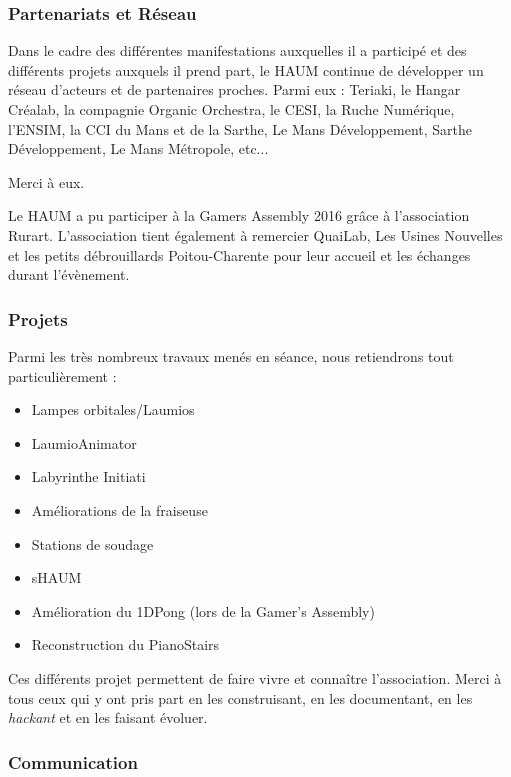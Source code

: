 \documentclass[a4paper, 11pt]{article}
\begin{document}
\subsubsection{Partenariats et Réseau}

Dans le cadre des différentes manifestations auxquelles il a participé et des différents projets auxquels il prend part, le HAUM continue de développer un réseau d'acteurs et de partenaires proches. Parmi eux : Teriaki, le Hangar Créalab, la compagnie Organic Orchestra, le CESI, la Ruche Numérique, l'ENSIM, la CCI du Mans et de la Sarthe, Le Mans Développement, Sarthe Développement, Le Mans Métropole, etc...

Merci à eux.

Le HAUM a pu participer à la Gamers Assembly 2016 grâce à l'association Rurart. L'association tient également à remercier QuaiLab, Les Usines Nouvelles et les petits débrouillards Poitou-Charente pour leur accueil et les échanges durant l'évènement.

\subsubsection{Projets}

Parmi les très nombreux travaux menés en séance, nous retiendrons tout particulièrement :

\begin{itemize}
    \item Lampes orbitales/Laumios
    \item LaumioAnimator
    \item Labyrinthe Initiati
    \item Améliorations de la fraiseuse
    \item Stations de soudage
    \item sHAUM
    \item Amélioration du 1DPong (lors de la Gamer's Assembly)
    \item Reconstruction du PianoStairs
\end{itemize}

Ces différents projet permettent de faire vivre et connaître l'association. Merci à tous ceux qui y ont pris part en les construisant, en les documentant, en les \textit{hackant} et en les faisant évoluer.

\subsubsection{Communication}
\end{document}
